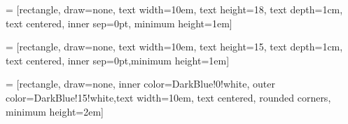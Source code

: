 



% 
 = [rectangle, draw=none, text width=10em, text
height=18, text depth=1cm, text centered, inner sep=0pt, minimum
height=1em]

 = [rectangle, draw=none, text width=10em, text
height=15, text depth=1cm, text centered, inner sep=0pt,minimum
height=1em]

 = [rectangle, draw=none, inner
color=DarkBlue!0!white, outer color=DarkBlue!15!white,text width=10em, text centered,
rounded corners, minimum height=2em]


